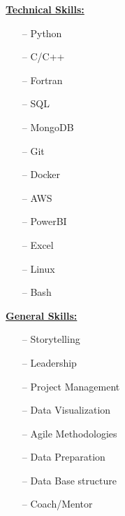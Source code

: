\vspace*{1mm}

\begin{multicols}{2}
    \small


    \href{.}{\textbf{\large Technical Skills:}}
    \vspace*{-4mm}

    \setlength{\columnsep}{2mm}
    \begin{multicols}{3}
        \begin{itemize}[leftmargin=3.5mm]
            \itemsep-1mm
            \item[--] Python
            \item[--] C/C++
            \item[--] Fortran
            \item[--] SQL
            \item[--] MongoDB
            \item[--] Git
            \item[--] Docker
            \item[--] AWS
            \item[--] PowerBI
            \item[--] Excel
            \item[--] Linux
            \item[--] Bash
        \end{itemize}
    \end{multicols}



    \href{.}{\textbf{\large  General Skills:}}
    \vspace*{-4mm}

    \setlength{\columnsep}{2mm}
    \begin{multicols}{2}
        \begin{itemize}[leftmargin=4mm]
            \itemsep-1mm
            \item[--] Storytelling
            \item[--] Leadership
            \item[--] Project Management
            \item[--] Data Visualization
            \item[--] Agile Methodologies
            \item[--] Data Preparation
            \item[--] Data Base structure
            \item[--] Coach/Mentor
        \end{itemize}
    \end{multicols}


\end{multicols}
